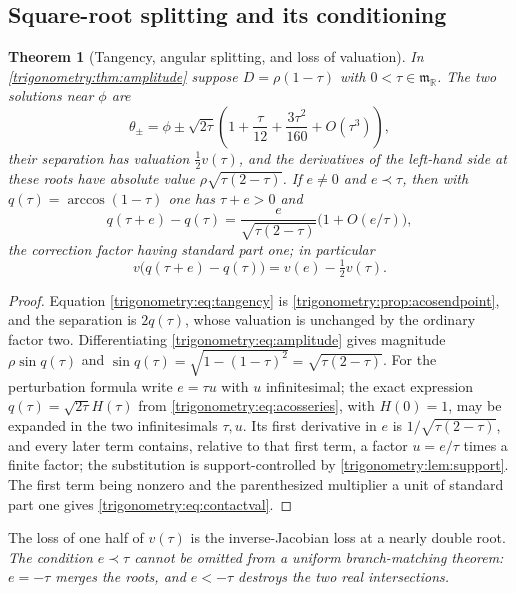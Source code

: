 \documentclass[11pt,letterpaper]{article}
\numberwithin{equation}{section}
\newtheorem{theorem}{Theorem}[section]
\theoremstyle{definition}
\theoremstyle{remark}
\newcommand{\R}{\mathbb R}
\newcommand{\mm}{\mathfrak m}
\begin{document}
\subsection{Square-root splitting and its conditioning}
\begin{theorem}[Tangency, angular splitting, and loss of valuation]
\label{trigonometry:thm:tangency}
In \cref{trigonometry:thm:amplitude} suppose $D=\rho(1-\tau)$ with $0<\tau\in\mm_{\R}$. The two
solutions near $\phi$ are
\begin{equation}\label{trigonometry:eq:tangency}
 \theta_\pm=\phi\pm\sqrt{2\tau}\left(1+\frac\tau{12}+\frac{3\tau^2}{160}+O(\tau^3)\right),
\end{equation}
their separation has valuation $\tfrac12v(\tau)$, and the derivatives of the left-hand side at
these roots have absolute value $\rho\sqrt{\tau(2-\tau)}$. If $e\ne0$ and $e\prec\tau$, then with
$q(\tau)=\arccos(1-\tau)$ one has $\tau+e>0$ and
\begin{equation}\label{trigonometry:eq:contactstability}
 q(\tau+e)-q(\tau)=\frac e{\sqrt{\tau(2-\tau)}}\bigl(1+O(e/\tau)\bigr),
\end{equation}
the correction factor having standard part one; in particular
\begin{equation}\label{trigonometry:eq:contactval}
 v\bigl(q(\tau+e)-q(\tau)\bigr)=v(e)-\tfrac12v(\tau).
\end{equation}
\end{theorem}
\begin{proof}
Equation \cref{trigonometry:eq:tangency} is \cref{trigonometry:prop:acosendpoint}, and the
separation is $2q(\tau)$, whose valuation is unchanged by the ordinary factor two. Differentiating
\cref{trigonometry:eq:amplitude} gives magnitude $\rho\sin q(\tau)$ and
$\sin q(\tau)=\sqrt{1-(1-\tau)^2}=\sqrt{\tau(2-\tau)}$. For the perturbation formula write
$e=\tau u$ with $u$ infinitesimal; the exact expression $q(\tau)=\sqrt{2\tau}H(\tau)$ from
\cref{trigonometry:eq:acosseries}, with $H(0)=1$, may be expanded in the two infinitesimals
$\tau,u$. Its first derivative in $e$ is $1/\sqrt{\tau(2-\tau)}$, and every later term contains,
relative to that first term, a factor $u=e/\tau$ times a finite factor; the substitution is
support-controlled by \cref{trigonometry:lem:support}. The first term being nonzero and the
parenthesized multiplier a unit of standard part one gives \cref{trigonometry:eq:contactval}.
\end{proof}
The loss of one half of $v(\tau)$ is the inverse-Jacobian loss at a nearly double root. \emph{The
condition $e\prec\tau$ cannot be omitted from a uniform branch-matching theorem: $e=-\tau$ merges
the roots, and $e<-\tau$ destroys the two real intersections.}
\end{document}
